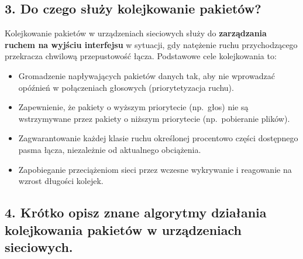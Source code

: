 \documentclass[12pt,a4paper]{article}
\begin{document}
\subsection*{3. Do czego służy kolejkowanie pakietów?}

Kolejkowanie pakietów w urządzeniach sieciowych służy do \textbf{zarządzania
ruchem na wyjściu interfejsu} w sytuacji, gdy natężenie ruchu przychodzącego
przekracza chwilową przepustowość łącza. Podstawowe cele kolejkowania to:

\begin{itemize}
  \item Gromadzenie napływających pakietów danych tak, aby nie wprowadzać
        opóźnień w połączeniach głosowych (priorytetyzacja ruchu).
  \item Zapewnienie, że pakiety o wyższym priorytecie (np.\ głos) nie są
        wstrzymywane przez pakiety o niższym priorytecie (np.\ pobieranie plików).
  \item Zagwarantowanie każdej klasie ruchu określonej procentowo części
        dostępnego pasma łącza, niezależnie od aktualnego obciążenia.
  \item Zapobieganie przeciążeniom sieci przez wczesne wykrywanie i
        reagowanie na wzrost długości kolejek.
\end{itemize}

\subsection*{4. Krótko opisz znane algorytmy działania kolejkowania pakietów
w urządzeniach sieciowych.}
\end{document}
